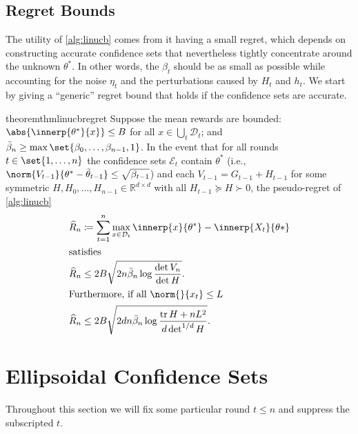 \documentclass{article}
\newcommand{\defeq}{\coloneq}
\newcommand{\Real}{\mathds{R}}
\DeclareMathOperator{\tr}{tr}
\DeclarePairedDelimiter{\abs}||
\newcommand{\Dset}[1]{\mathcal{D}_{#1}}
\newcommand{\Eset}[1]{\mathcal{E}_{#1}}
\begin{document}
\subsection{Regret Bounds}
\label{sec:regret-bounds}

The utility of \cref{alg:linucb} comes from it having a small regret,
which depends on constructing accurate confidence sets that
nevertheless tightly concentrate around the unknown $\theta^*$.  In
other words, the $\beta_t$ should be as small as possible while
accounting for the noise $\eta_t$ and the perturbations caused by
$H_t$ and $h_t$.  We start by giving a ``generic'' regret bound that
holds if the confidence sets are accurate.

\begin{restatable}{theorem}{thmlinucbregret}
  \label{thm:linucb-regret}%
  Suppose the mean rewards are bounded:
  $\abs{\innerp{\theta^*}{x}} \le B$ for all $x\in\bigcup_t\Dset{t}$;
  and $\bar\beta_n \ge \max\set{\beta_0,\dotsc,\beta_{n-1},1}$.  In
  the event that for all rounds $t\in\set{1,\dotsc,n}$ the confidence
  sets $\Eset{t}$ contain $\theta^*$ (i.e.,
  $\norm{V_{t-1}}{\theta^* - \tilde\theta_{t-1}} \le
  \sqrt{\beta_{t-1}}$) and each $V_{t-1} = G_{t-1} + H_{t-1}$ for some
  symmetric $H,H_0,\dotsc,H_{n-1} \in \Real^{d\times d}$ with all
  $H_{t-1} \succeq H \succ 0$, the pseudo-regret of \cref{alg:linucb}
  \begin{align*}
    \widehat R_n
    &\defeq \sum_{t=1}^n \max_{x\in\Dset{t}} \innerp{x}{\theta^*} - \innerp{X_t}{\theta*} \\
    \shortintertext{satisfies}
    \widehat R_n
    &\le 2B\sqrt{2n \bar\beta_n \log\frac{\det V_n}{\det H}}. \\
    \shortintertext{Furthermore, if all $\norm{}{x_t} \le L$}
    \widehat R_n
    &\le 2B\sqrt{2dn \bar\beta_n \log\frac{\tr H + nL^2}{d\det^{1/d} H}}.
  \end{align*}
\end{restatable}


\section{Ellipsoidal Confidence Sets}
\label{sec:ellips-conf-bounds}

Throughout this section we will fix some particular round $t \le n$
and suppress the subscripted $t$.
\end{document}
